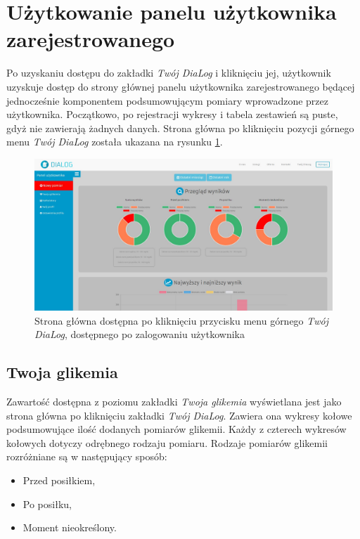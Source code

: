 \section{Użytkowanie panelu użytkownika zarejestrowanego}
Po uzyskaniu dostępu do zakładki \textit{Twój DiaLog} i kliknięciu jej, użytkownik uzyskuje dostęp do strony głównej panelu użytkownika zarejestrowanego będącej jednocześnie komponentem podsumowującym pomiary wprowadzone przez użytkownika. Początkowo, po rejestracji wykresy i tabela zestawień są puste, gdyż nie zawierają żadnych danych. Strona główna po kliknięciu pozycji górnego menu \textit{Twój DiaLog} została ukazana na rysunku \ref{Rys:firstPage}.

\begin{figure}[h]
	\centering\includegraphics[scale=0.3]{images/first_page.jpg}
	\caption{Strona główna dostępna po kliknięciu przycisku menu górnego \textit{Twój DiaLog}, dostępnego po zalogowaniu użytkownika}
	\label{Rys:firstPage}
\end{figure}

\subsection{Twoja glikemia}
Zawartość dostępna z poziomu zakładki \textit{Twoja glikemia} wyświetlana jest jako strona główna po kliknięciu zakładki \textit{Twój DiaLog}. Zawiera ona wykresy kołowe podsumowujące ilość dodanych pomiarów glikemii. Każdy z czterech wykresów kołowych dotyczy odrębnego rodzaju pomiaru. Rodzaje pomiarów glikemii rozróżniane są w następujący sposób:

\begin{itemize}
	\item Przed posiłkiem,
	\item Po posiłku,
	\item Moment nieokreślony.
\end{itemize}

